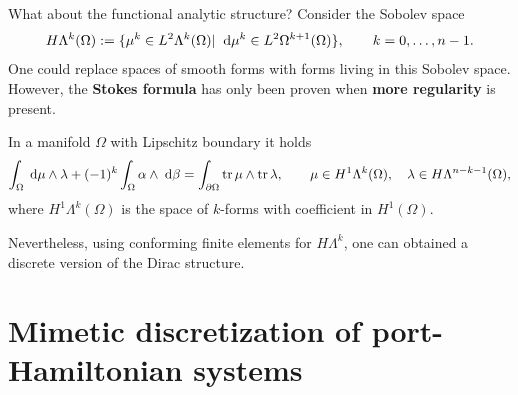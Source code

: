 \documentclass[aspectratio=169]{beamer}
\DeclareMathOperator{\tr}{tr}
\begin{document}
\begin{frame}{What about the functional analytic structure?}
Consider the Sobolev space
\begin{equation*}
	H\Lambda^k(\Omega) := \{\mu^k \in L^2 \Lambda^k(\Omega) \vert \; \d{\mu^k} \in L^2 \Omega^{k+1}(\Omega)\}, \qquad k=0, \dots, n-1.
\end{equation*}
One could replace spaces of smooth forms with forms living in this Sobolev space. \\
However, the \textbf{Stokes formula} has only been proven when \textbf{more regularity} is present.
\begin{theorem}
	In a manifold $\Omega$ with Lipschitz boundary it holds
	\begin{equation*}
		\int_\Omega \d{\mu} \wedge \lambda + (-1)^k \int_\Omega \alpha \wedge \d{\beta} = \int_{\partial \Omega}\tr {\mu} \wedge \tr{\lambda}, \qquad \mu \in H^1\Lambda^{k}(\Omega), \quad \lambda \in H \Lambda^{n-k-1}(\Omega),
	\end{equation*}
	where $H^1\Lambda^k(\Omega)$ is the space of $k$-forms with coefficient in $H^1(\Omega)$.
\end{theorem}

Nevertheless, using conforming finite elements for $H\Lambda^k$, one can obtained a discrete version of the Dirac structure.

\end{frame}

\section{Mimetic discretization of port-Hamiltonian systems}
\end{document}
